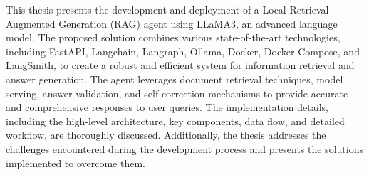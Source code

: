 This thesis presents the development and deployment of a Local Retrieval-Augmented Generation (RAG) agent using LLaMA3, an advanced language model. The proposed solution combines various state-of-the-art technologies, including FastAPI, Langchain, Langraph, Ollama, Docker, Docker Compose, and LangSmith, to create a robust and efficient system for information retrieval and answer generation. The agent leverages document retrieval techniques, model serving, answer validation, and self-correction mechanisms to provide accurate and comprehensive responses to user queries. The implementation details, including the high-level architecture, key components, data flow, and detailed workflow, are thoroughly discussed. Additionally, the thesis addresses the challenges encountered during the development process and presents the solutions implemented to overcome them.